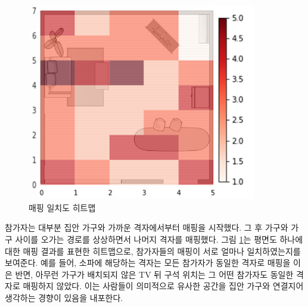 
\begin{figure}
\centering
\includegraphics[width=10cm]{images/heatmap.png}
\caption{매핑 일치도 히트맵}
\label{fig:heatmap}
\end{figure}

참가자는 대부분 집안 가구와 가까운 격자에서부터 매핑을 시작했다. 그 후 가구와 가구 사이를 오가는 경로를 상상하면서 나머지 격자를 매핑했다. 그림 \ref{fig:heatmap}는 평면도 하나에 대한 매핑 결과를 표현한 히트맵으로, 참가자들의 매핑이 서로 얼마나 일치하였는지를 보여준다. 예를 들어, 소파에 해당하는 격자는 모든 참가자가 동일한 격자로 매핑을 이은 반면, 아무런 가구가 배치되지 않은 TV 뒤 구석 위치는 그 어떤 참가자도 동일한 격자로 매핑하지 않았다. 이는 사람들이 의미적으로 유사한 공간을 집안 가구와 연결지어 생각하는 경향이 있음을 내포한다.

